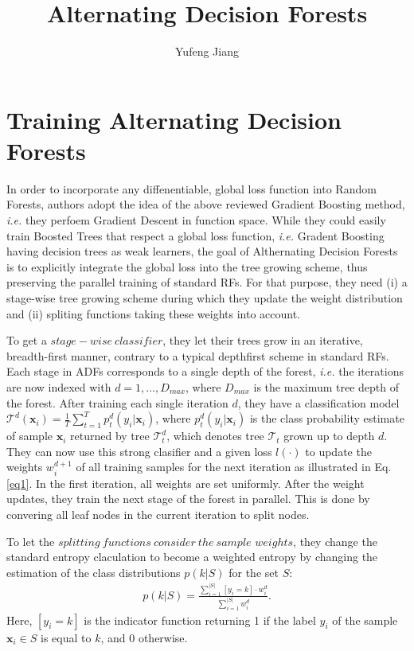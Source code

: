 \documentclass[10pt,twocolumn,letterpaper]{article}
\begin{document}
\title{Alternating Decision Forests}
\author{Yufeng Jiang}
\maketitle
\balance

\section{Training Alternating Decision Forests}

In order to incorporate any diffenentiable, global loss function into Random Forests, authors adopt the idea of the above reviewed Gradient Boosting method, \emph{i.e.} they perfoem Gradient Descent in function space. While they could easily train Boosted Trees that respect a global loss function, \emph{i.e.} Gradent Boosting having decision trees as weak learners, the goal of Althernating Decision Forests is to explicitly integrate the global loss into the tree growing scheme, thus preserving the parallel training of standard RFs. For that purpose, they need (i) a stage-wise tree growing scheme during which they update the weight distribution and (ii) spliting functions taking these weights into account.

To get a $stage-wise~classifier$, they let their trees grow in an iterative, breadth-first manner, contrary to a typical depthfirst scheme in standard RFs. Each stage in ADFs corresponds to a single depth of the forest, \emph{i.e.} the iterations are now indexed with $d = 1, \dots, D_{max}$, where $D_{max}$ is the maximum tree depth of the forest. After training each single iteration $d$, they have a classification model $\mathcal{T}^d(\mathbf{x}_i) = \frac{1}{T}\sum_{t=1}^Tp_t^d(y_i|\mathbf{x}_i)$, where $p_t^d(y_i|\mathbf{x}_i)$ is the class probability estimate of sample $\mathbf{x}_i$ returned by tree $\mathcal{T}_t^d$, which denotes tree $\mathcal{T}_t$ grown up to depth $d$. They can now use this strong clasifier and a given loss $l(\cdot)$ to update the weights $w_i^{d+1}$ of all training samples for the next iteration as illustrated in Eq.\ref{eq1}. In the first iteration, all weights are set uniformly. After the weight updates, they train the next stage of the forest in parallel. This is done by convering all leaf nodes in the current iteration to split nodes.

To let the $splitting~functions~consider~the~sample$ $weights$, they change the standard entropy claculation to become a weighted entropy by changing the estimation of the class distributions $p(k|S)$ for the set $S$:\\
\begin{gather*}
p(k|S) = \frac{\sum_{i=1}^{|S|}[y_i = k]\cdot w_i^d}{\sum_{i=1}^{|S|}w_i^d}.
\tag{1}
\label{eq1}
\end{gather*}
Here, $[y_i = k]$ is the indicator function returning 1 if the label $y_i$ of the sample $\mathbf{x}_i \in S$ is equal to $k$, and 0 otherwise. 
\end{document}
